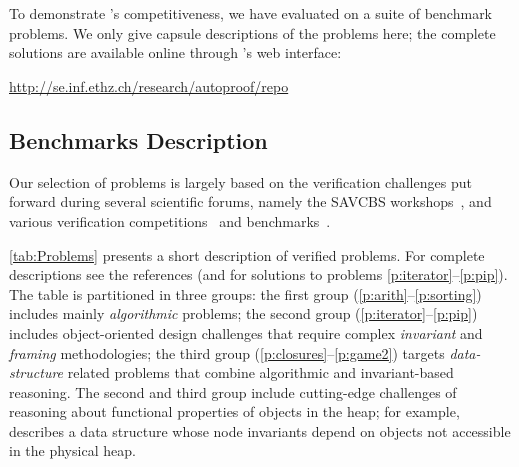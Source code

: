 \section{\VSRepo}
\label{sec:eval-repo}

To demonstrate \AutoProof's competitiveness, we have evaluated \AutoProof on a suite of benchmark problems. We only give capsule descriptions of the problems here; the complete solutions are available online through \AutoProof's web interface:
\begin{center}
\url{http://se.inf.ethz.ch/research/autoproof/repo} 
\end{center}

\subsection{Benchmarks Description} \label{sec:problems}

Our selection of problems is largely based on the verification challenges put forward during several scientific forums, namely the SAVCBS workshops~\cite{SAVCBS}, and various verification competitions~\cite{KLEBANOV11,BORMER11,FILLIATRE12,HUISMAN12} and benchmarks~\cite{VSI08}.

\autoref{tab:Problems} presents a short description of verified problems. %
For complete descriptions see the references (and \cite{POLIKARPOVA14} for solutions to problems \ref{p:iterator}--\ref{p:pip}).
The table is partitioned in three groups: the first group (\ref{p:arith}--\ref{p:sorting}) includes mainly \emph{algorithmic} problems; the second group (\ref{p:iterator}--\ref{p:pip}) includes object-oriented design challenges that require complex \emph{invariant} and \emph{framing} methodologies; the third group (\ref{p:closures}--\ref{p:game2}) targets \emph{data-structure} related problems that combine algorithmic and invariant-based reasoning.
The second and third group include cutting-edge challenges of reasoning about functional properties of objects in the heap; for example,  describes a data structure whose node invariants depend on objects not accessible in the physical heap.


